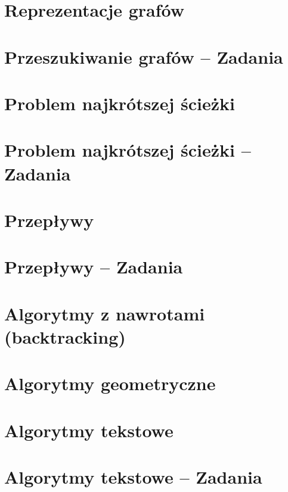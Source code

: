 \section{Reprezentacje grafów}

\section{Przeszukiwanie grafów -- Zadania}

\section{Problem najkrótszej ścieżki}

\section{Problem najkrótszej ścieżki -- Zadania}

\section{Przepływy}

\section{Przepływy -- Zadania}

\section{Algorytmy z nawrotami (backtracking)}

\section{Algorytmy geometryczne}

\section{Algorytmy tekstowe}

\section{Algorytmy tekstowe -- Zadania}


